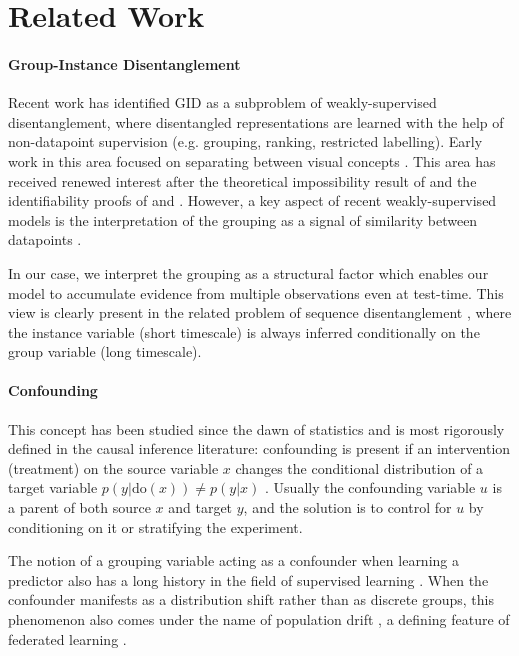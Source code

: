 \documentclass[nohyperref]{article}
\theoremstyle{plain}
\theoremstyle{definition}
\theoremstyle{remark}
\begin{document}
\section{Related Work}

\paragraph{Group-Instance Disentanglement} Recent work \citep{Shu2020Weakly, Locatello2020WeaklySupervisedDW} has identified GID as a subproblem of weakly-supervised disentanglement, where disentangled representations are learned with the help of non-datapoint supervision (e.g. grouping, ranking, restricted labelling). Early work in this area focused on separating between visual concepts \citep{Kulkarni2015DeepCI, Reed2015DeepVA}. This area has received renewed interest after the theoretical impossibility result of \citet{Locatello2019ChallengingCA} and the identifiability proofs of \citet{Khemakhem2020VariationalAA} and \citet{Mita2021AnID}. However, a key aspect of recent weakly-supervised models is the interpretation of the grouping as a signal of similarity between datapoints \citep{Chen2020WeaklySD}. 

In our case, we interpret the grouping as a structural factor which enables our model to accumulate evidence from multiple observations even at test-time. This view is clearly present in the related problem of sequence disentanglement \citep{Hsu2017UnsupervisedLO, Denton2017UnsupervisedLO, Li2018DisentangledSA}, where the instance variable (short timescale) is always inferred conditionally on the group variable (long timescale).

\paragraph{Confounding} This concept has been studied since the dawn of statistics and is most rigorously defined in the causal inference literature: confounding is present if an intervention (treatment) on the source variable $x$ changes the conditional distribution of a target variable $p(y | \mathrm{do}(x)) \neq p(y | x)$ \citep{Greenland1999ConfoundingAC}. Usually the confounding variable $u$ is a parent of both source $x$ and target $y$, and the solution is to control for $u$ by conditioning on it or stratifying the experiment. 

The notion of a grouping variable acting as a confounder when learning a predictor also has a long history in the field of supervised learning \citep{Morabia2010HistoryOT}. When the confounder manifests as a distribution shift rather than as discrete groups, this phenomenon also comes under the name of population drift \citep{Kelly1999Impact}, a defining feature of federated learning \citep{Kairouz2021AdvancesAO}.
\end{document}
